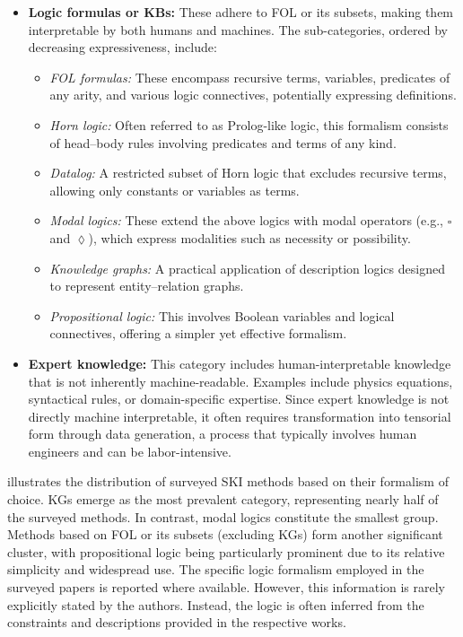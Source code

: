 \begin{itemize}
    \item \textbf{Logic formulas or \glspl{KB}:} These adhere to \gls{FOL} or its subsets, making them interpretable by both humans and machines.
    The sub-categories, ordered by decreasing expressiveness, include:
    \begin{itemize}
        \item \emph{\gls{FOL} formulas:} These encompass recursive terms, variables, predicates of any arity, and various logic connectives, potentially expressing definitions.
        \item \emph{Horn logic:} Often referred to as Prolog-like logic, this formalism consists of head–body rules involving predicates and terms of any kind.
        \item \emph{Datalog:} A restricted subset of Horn logic that excludes recursive terms, allowing only constants or variables as terms.
        \item \emph{Modal logics:} These extend the above logics with modal operators (e.g., \(\square\) and \(\lozenge\)), which express modalities such as necessity or possibility.
        \item \emph{Knowledge graphs:} A practical application of description logics designed to represent entity–relation graphs.
        \item \emph{Propositional logic:} This involves Boolean variables and logical connectives, offering a simpler yet effective formalism.
    \end{itemize}
    \item \textbf{Expert knowledge:} This category includes human-interpretable knowledge that is not inherently machine-readable.
    Examples include physics equations, syntactical rules, or domain-specific expertise.
    Since expert knowledge is not directly machine interpretable, it often requires transformation into tensorial form through data generation, a process that typically involves human engineers and can be labor-intensive.
\end{itemize}
%
 illustrates the distribution of surveyed \gls{SKI} methods based on their formalism of choice.
%
\Glspl{KG} emerge as the most prevalent category, representing nearly half of the surveyed methods.
%
In contrast, modal logics constitute the smallest group.
%
Methods based on \gls{FOL} or its subsets (excluding \glspl{KG}) form another significant cluster, with propositional logic being particularly prominent due to its relative simplicity and widespread use.
%
The specific logic formalism employed in the surveyed papers is reported where available.
%
However, this information is rarely explicitly stated by the authors.
%
Instead, the logic is often inferred from the constraints and descriptions provided in the respective works.

